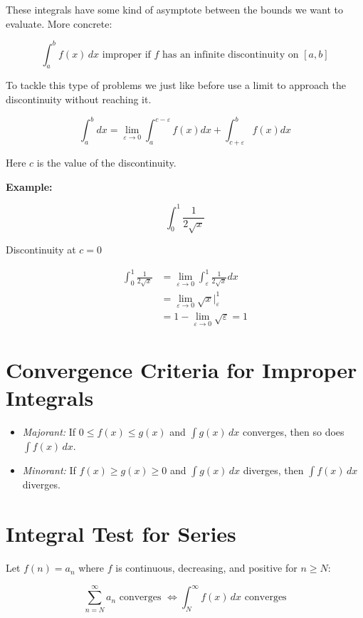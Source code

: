 These integrals have some kind of asymptote between the bounds we want to evaluate.  
More concrete: 

\[
    \int_a^b f(x)\,dx \text{ improper if } f \text{ has an infinite discontinuity on } [a, b]
\]

To tackle this type of problems we just like before use a limit to approach the discontinuity without 
reaching it.

\[
    \int_{a}^{b} dx = \lim_{\varepsilon \to 0 } \int_{a}^{c - \varepsilon} f(x)dx + 
    \int_{c + \varepsilon}^{b} f(x) dx 
\]

Here \(c\) is the value of the discontinuity.

\textbf{Example:}

\[
    \int_{0}^{1} \frac{1}{2\sqrt{x}}
\]

Discontinuity at \(c = 0\)

\begin{align*}
    \int_{0}^{1} \frac{1}{2\sqrt{x}} &= \lim_{\varepsilon \to 0} \int_{\varepsilon}^{1} \frac{1}{2\sqrt{x}} dx\\
    &= \lim_{\varepsilon \to 0} \sqrt{x} |_{\varepsilon}^{1} \\
    &= 1 - \lim_{\varepsilon \to 0} \sqrt{\varepsilon} = 1
\end{align*}

\section{Convergence Criteria for Improper Integrals}

\begin{itemize}

    \item \emph{Majorant:} If \(0 \le f(x) \le g(x)\) and \(\int g(x)\,dx\) converges, then so does \(\int f(x)\,dx\).

    \item \emph{Minorant:} If \(f(x) \ge g(x) \ge 0\) and \(\int g(x)\,dx\) diverges, then \(\int f(x)\,dx\) diverges.

\end{itemize}

\section{Integral Test for Series}

Let \(f(n) = a_n\) where \(f\) is continuous, decreasing, and positive for \(n \ge N\):

\[
    \sum_{n=N}^\infty a_n \text{ converges } \iff \int_N^\infty f(x)\,dx \text{ converges}
\]

